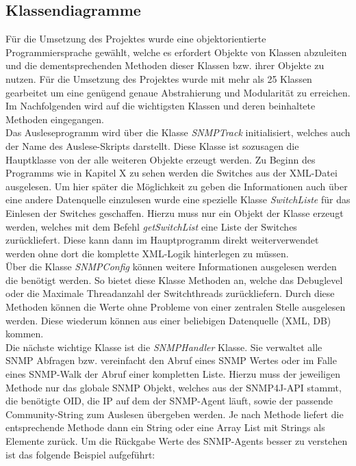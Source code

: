 \subsection{Klassendiagramme}
\label{subsec:classdiagrams}

Für die Umsetzung des Projektes wurde eine objektorientierte Programmiersprache gewählt, welche es erfordert Objekte von Klassen abzuleiten und die dementsprechenden Methoden dieser Klassen bzw. ihrer Objekte zu nutzen. Für die Umsetzung des Projektes wurde mit mehr als 25 Klassen gearbeitet um eine genügend genaue Abstrahierung und Modularität zu erreichen. Im Nachfolgenden wird auf die wichtigsten Klassen und deren beinhaltete Methoden eingegangen.\\
Das Ausleseprogramm wird über die Klasse \textit{SNMPTrack} initialisiert, welches auch der Name des Auslese-Skripts darstellt. Diese Klasse ist sozusagen die Hauptklasse von der alle weiteren Objekte erzeugt werden. Zu Beginn des Programms wie in Kapitel X zu sehen werden die Switches aus der XML-Datei ausgelesen. Um hier später die Möglichkeit zu geben die Informationen auch über eine andere Datenquelle einzulesen wurde eine spezielle Klasse \textit{SwitchListe} für das Einlesen der Switches geschaffen. Hierzu muss nur ein Objekt der Klasse erzeugt werden, welches mit dem Befehl \textit{getSwitchList} eine Liste der Switches zurückliefert. Diese kann dann im Hauptprogramm direkt weiterverwendet werden ohne dort die komplette XML-Logik hinterlegen zu müssen.\\
Über die Klasse \textit{SNMPConfig} können weitere Informationen ausgelesen werden die benötigt werden. So bietet diese Klasse Methoden an, welche das Debuglevel oder die Maximale Threadanzahl der Switchthreads zurückliefern. Durch diese Methoden können die Werte ohne Probleme von einer zentralen Stelle ausgelesen werden. Diese wiederum können aus einer beliebigen Datenquelle (XML, DB) kommen.\\
Die nächste wichtige Klasse ist die \textit{SNMPHandler} Klasse. Sie verwaltet alle SNMP Abfragen bzw. vereinfacht den Abruf eines SNMP Wertes oder im Falle eines SNMP-Walk der Abruf einer kompletten Liste. Hierzu muss der jeweiligen Methode nur das globale SNMP Objekt, welches aus der SNMP4J-API stammt, die benötigte OID, die IP auf dem der SNMP-Agent läuft, sowie der passende Community-String zum Auslesen übergeben werden. Je nach Methode liefert die entsprechende Methode dann ein String oder eine Array List mit Strings als Elemente zurück. Um die Rückgabe Werte des SNMP-Agents besser zu verstehen ist das folgende Beispiel aufgeführt:\\

